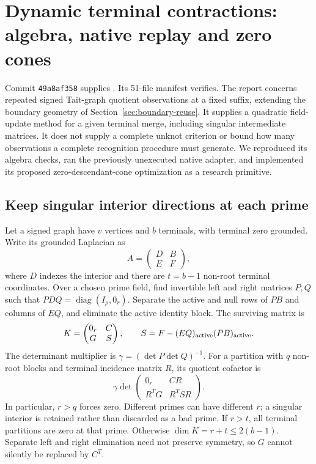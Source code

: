 \section{Dynamic terminal contractions: algebra, native replay and zero cones}
\label{sec:dynamic-terminal-review}

Commit \texttt{49a8af358} supplies
. Its 51-file manifest
verifies. The report concerns repeated signed Tait-graph quotient observations
at a fixed suffix, extending the boundary geometry of
Section~\ref{sec:boundary-reuse}. It supplies a quadratic field-update method
for a given terminal merge, including singular intermediate matrices. It
does not supply a complete unknot criterion or bound how many observations
a complete recognition procedure must generate. We reproduced its algebra
checks, ran the previously unexecuted native adapter, and implemented its
proposed zero-descendant-cone optimization as a research primitive.

\subsection{Keep singular interior directions at each prime}

Let a signed graph have $v$ vertices and $b$ terminals, with terminal zero
grounded. Write its grounded Laplacian as
\[
 A=\begin{pmatrix}D&B\\E&F\end{pmatrix},
\]
where $D$ indexes the interior and there are $t=b-1$ non-root terminal
coordinates. Over a chosen prime field, find invertible left and right
matrices $P,Q$ such that $PDQ=\operatorname{diag}(I_\rho,0_r)$. Separate
the active and null rows of $PB$ and columns of $EQ$, and eliminate the
active identity block. The surviving matrix is
\[
 K=\begin{pmatrix}0_r&C\\G&S\end{pmatrix},
 \qquad S=F-(EQ)_{\rm active}(PB)_{\rm active}.
\]
The determinant multiplier is
$\gamma=(\det P\det Q)^{-1}$. For a partition with $q$ non-root blocks
and terminal incidence matrix $R$, its quotient cofactor is
\[
 \gamma\det\begin{pmatrix}0_r&CR\\R^T G&R^T S R\end{pmatrix}.
\]
In particular, $r>q$ forces zero. Different primes can have different $r$;
a singular interior is retained rather than discarded as a bad prime.
If $r>t$, all terminal partitions are zero at that prime. Otherwise
$\dim K=r+t\le2(b-1)$. Separate left and right elimination need not preserve
symmetry, so $G$ cannot silently be replaced by $C^T$.

